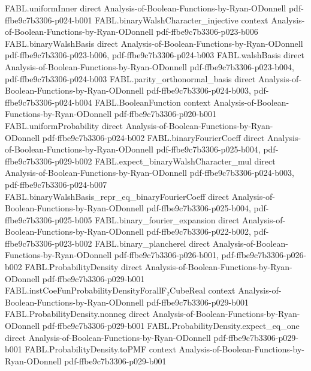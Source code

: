 \begin{theorem}
\proofstep
  {FABL.uniformInner}
  {direct}
  {Analysis-of-Boolean-Functions-by-Ryan-ODonnell}
  {pdf-ffbe9c7b3306-p024-b001}
\proofstep
  {FABL.binaryWalshCharacter_injective}
  {context}
  {Analysis-of-Boolean-Functions-by-Ryan-ODonnell}
  {pdf-ffbe9c7b3306-p023-b006}
\proofstep
  {FABL.binaryWalshBasis}
  {direct}
  {Analysis-of-Boolean-Functions-by-Ryan-ODonnell}
  {pdf-ffbe9c7b3306-p023-b006,
    pdf-ffbe9c7b3306-p024-b003}
\proofstep
  {FABL.walshBasis}
  {direct}
  {Analysis-of-Boolean-Functions-by-Ryan-ODonnell}
  {pdf-ffbe9c7b3306-p023-b004,
    pdf-ffbe9c7b3306-p024-b003}
\proofstep
  {FABL.parity_orthonormal_basis}
  {direct}
  {Analysis-of-Boolean-Functions-by-Ryan-ODonnell}
  {pdf-ffbe9c7b3306-p024-b003,
    pdf-ffbe9c7b3306-p024-b004}
\proofstep
  {FABL.BooleanFunction}
  {context}
  {Analysis-of-Boolean-Functions-by-Ryan-ODonnell}
  {pdf-ffbe9c7b3306-p020-b001}
\proofstep
  {FABL.uniformProbability}
  {direct}
  {Analysis-of-Boolean-Functions-by-Ryan-ODonnell}
  {pdf-ffbe9c7b3306-p024-b002}
\proofstep
  {FABL.binaryFourierCoeff}
  {direct}
  {Analysis-of-Boolean-Functions-by-Ryan-ODonnell}
  {pdf-ffbe9c7b3306-p025-b004,
    pdf-ffbe9c7b3306-p029-b002}
\proofstep
  {FABL.expect_binaryWalshCharacter_mul}
  {direct}
  {Analysis-of-Boolean-Functions-by-Ryan-ODonnell}
  {pdf-ffbe9c7b3306-p024-b003,
    pdf-ffbe9c7b3306-p024-b007}
\proofstep
  {FABL.binaryWalshBasis_repr_eq_binaryFourierCoeff}
  {direct}
  {Analysis-of-Boolean-Functions-by-Ryan-ODonnell}
  {pdf-ffbe9c7b3306-p025-b004,
    pdf-ffbe9c7b3306-p025-b005}
\proofstep
  {FABL.binary_fourier_expansion}
  {direct}
  {Analysis-of-Boolean-Functions-by-Ryan-ODonnell}
  {pdf-ffbe9c7b3306-p022-b002,
    pdf-ffbe9c7b3306-p023-b002}
\proofstep
  {FABL.binary_plancherel}
  {direct}
  {Analysis-of-Boolean-Functions-by-Ryan-ODonnell}
  {pdf-ffbe9c7b3306-p026-b001,
    pdf-ffbe9c7b3306-p026-b002}
\proofstep
  {FABL.ProbabilityDensity}
  {direct}
  {Analysis-of-Boolean-Functions-by-Ryan-ODonnell}
  {pdf-ffbe9c7b3306-p029-b001}
\proofstep
  {FABL.instCoeFunProbabilityDensityForallF₂CubeReal}
  {context}
  {Analysis-of-Boolean-Functions-by-Ryan-ODonnell}
  {pdf-ffbe9c7b3306-p029-b001}
\proofstep
  {FABL.ProbabilityDensity.nonneg}
  {direct}
  {Analysis-of-Boolean-Functions-by-Ryan-ODonnell}
  {pdf-ffbe9c7b3306-p029-b001}
\proofstep
  {FABL.ProbabilityDensity.expect_eq_one}
  {direct}
  {Analysis-of-Boolean-Functions-by-Ryan-ODonnell}
  {pdf-ffbe9c7b3306-p029-b001}
\proofstep
  {FABL.ProbabilityDensity.toPMF}
  {context}
  {Analysis-of-Boolean-Functions-by-Ryan-ODonnell}
  {pdf-ffbe9c7b3306-p029-b001}
\proofstep

\end{theorem}
